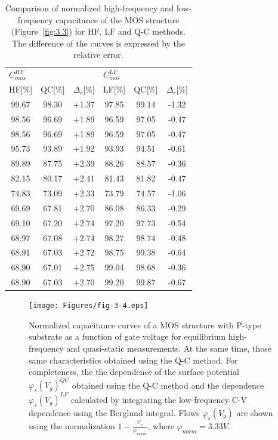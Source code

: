 \begin{table}[h!]\centering
  \begin{tabular}{c c c c c c}
    \multicolumn{3}{l}{$C^{HF}_{mos}$} & \multicolumn{3}{l}{$C^{LF}_{mos}$} \\
    HF[\%] & QC[\%] & $\Delta_r$[\%] & LF[\%] & QC[\%] & $\Delta_r$[\%] \\
    \hline%
    99.67 & 98.30 & +1.37 & 97.85 & 99.14 & -1.32 \\
    98.56 & 96.69 & +1.89 & 96.59 & 97.05 & -0.47 \\
    98.56 & 96.69 & +1.89 & 96.59 & 97.05 & -0.47 \\
    95.73 & 93.89 & +1.92 & 93.93 & 94.51 & -0.61 \\
    89.89 & 87.75 & +2.39 & 88.26 & 88.57 & -0.36 \\
    82.15 & 80.17 & +2.41 & 81.43 & 81.82 & -0.47 \\
    74.83 & 73.09 & +2.33 & 73.79 & 74.57 & -1.06 \\
    69.69 & 67.81 & +2.70 & 86.08 & 86.33 & -0.29 \\
    69.10 & 67.20 & +2.74 & 97.20 & 97.73 & -0.54 \\
    68.97 & 67.08 & +2.74 & 98.27 & 98.74 & -0.48 \\
    68.91 & 67.03 & +2.72 & 98.75 & 99.38 & -0.64 \\
    68.90 & 67.01 & +2.75 & 99.04 & 98.68 & -0.36 \\
    68.90 & 67.03 & +2.70 & 99.20 & 99.87 & -0.67 \\
  \end{tabular}
  \caption[Comparison of normalized frequency and low-frequency
    capacitance of the MOS structure (Figure~\ref{fig:3.3}) for HF, LF
    and Q-C methods]{Comparison of normalized high-frequency and
    low-frequency capacitance of the MOS structure
    (Figure~\ref{fig:3.3}) for HF, LF and Q-C methods. The difference
    of the curves is expressed by the relative error.}\label{tab:3.1}
\end{table}

\newpage
\begin{figure}[h!]\centering
\texttt{[image: Figures/fig-3-4.eps]}
\captionsetup{justification=raggedright, singlelinecheck=false}
\caption[Normalized capacitance curves of MOS structure with substrate type
  P as a function of gate voltage for equilibrium high-frequency and
  quasi-static measurements]{Normalized capacitance curves of a MOS structure with
  P-type substrate as a function of gate voltage for equilibrium
  high-frequency and quasi-static measurements.  At the same time, those
  same characteristics obtained using the Q-C method. For completeness, the
  the dependence of the surface potential
  ${\varphi_s(V_g)}^{QC}$ obtained using the Q-C method and the dependence
  ${\varphi_s(V_g)}^{LF}$ calculated by integrating the low-frequency C-V
  dependence using the Berglund integral. Flows
  $\varphi_s(V_g)$ are shown using the normalization $1 -
  \frac{\varphi_s}{\varphi_{norm}}$, where $\varphi_{norm}=3.33V$.}\label{fig:3.4}
\end{figure}

